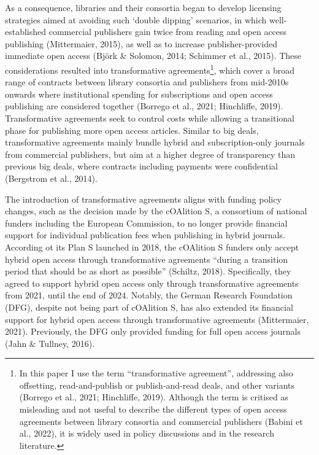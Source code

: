 \documentclass[a4paper,man,floatsintext,longtable,noextraspace,12pt]{apa6}
\begin{document}
As a consequence, libraries and their consortia began to develop
licensing strategies aimed at avoiding such `double dipping' scenarios,
in which well-established commercial publishers gain twice from reading
and open access publishing (Mittermaier, 2015), as well as to increase
publisher-provided immediate open access (Björk \& Solomon, 2014;
Schimmer et al., 2015). These considerations resulted into
transformative agreements\footnote{In this paper I use the term
  ``transformative agreement'', addressing also offsetting,
  read-and-publish or publish-and-read deals, and other variants
  (Borrego et al., 2021; Hinchliffe, 2019). Although the term is
  critised as misleading and not useful to describe the different types
  of open access agreements between library consortia and commercial
  publishers (Babini et al., 2022), it is widely used in policy
  discussions and in the research literature.}, which cover a broad
range of contracts between library consortia and publishers from
mid-2010s onwards where institutional spending for subscriptions and
open access publishing are considered together (Borrego et al., 2021;
Hinchliffe, 2019). Transformative agreements seek to control costs while
allowing a transitional phase for publishing more open access articles.
Similar to big deals, transformative agreements mainly bundle hybrid and
subscription-only journals from commercial publishers, but aim at a
higher degree of transparency than previous big deals, where contracts
including payments were confidential (Bergstrom et al., 2014).

The introduction of transformative agreements aligns with funding policy
changes, such as the decision made by the cOAlition S, a consortium of
national funders including the European Commission, to no longer provide
financial support for individual publication fees when publishing in
hybrid journals. According ot its Plan S launched in 2018, the cOAlition
S funders only accept hybrid open access through transformative
agreements ``during a transition period that should be as short as
possible'' (Schiltz, 2018). Specifically, they agreed to support hybrid
open access only through transformative agreements from 2021, until the
end of 2024. Notably, the German Research Foundation (DFG), despite not
being part of cOAlition S, has also extended its financial support for
hybrid open access through transformative agreements (Mittermaier,
2021). Previously, the DFG only provided funding for full open access
journals (Jahn \& Tullney, 2016).
\end{document}
